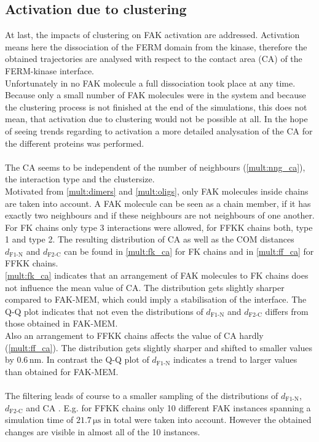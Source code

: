 \subsection{Activation due to clustering}
At last, the impacts of clustering on FAK activation are addressed. Activation means here the dissociation of the FERM domain from the kinase, therefore the obtained trajectories are analysed with respect to the contact area (CA) of the FERM-kinase interface.\\
Unfortunately in no FAK molecule a full dissociation took place at any time. Because only a small number of FAK molecules were in the system and because the clustering process is not finished at the end of the simulations, this does not mean, that activation due to clustering would not be possible at all. In the hope of seeing trends regarding to activation a more detailed analysation of the CA for the different proteins was performed.\\
\\
The CA seems to be independent of the number of neighbours (\autoref{mult:nng_ca}), the interaction type and the clustersize.\\
Motivated from \autoref{mult:dimers} and \autoref{mult:oligs}, only FAK molecules inside chains are taken into account. A FAK molecule can be seen as a chain member, if it has exactly two neighbours and if these neighbours are not neighbours of one another. For FK chains only type 3 interactions were allowed, for FFKK chains both, type 1 and type 2. The resulting distribution of CA as well as the COM distances $d_\text{F1-N}$ and $d_\text{F2-C}$ can be found in \autoref{mult:fk_ca} for FK chains and in \autoref{mult:ff_ca} for FFKK chains.\\
\autoref{mult:fk_ca} indicates that an arrangement of FAK molecules to FK chains does not influence the mean value of CA. The distribution gets slightly sharper compared to FAK-MEM, which could imply a stabilisation of the interface. The Q-Q plot indicates that not even the distributions of $d_\text{F1-N}$ and $d_\text{F2-C}$ differs from those obtained in FAK-MEM.\\
Also an arrangement to FFKK chains affects the value of CA hardly (\autoref{mult:ff_ca}). The distribution gets slightly sharper and shifted to smaller values by $0.6\,\si{\nano\metre}$. In contrast the Q-Q plot of $d_\text{F1-N}$ indicates a trend to larger values than obtained for FAK-MEM.\\
\\
The filtering leads of course to a smaller sampling of the distributions of $d_\text{F1-N}$, $d_\text{F2-C}$ and CA . E.g. for FFKK chains only 10 different FAK instances spanning a simulation time of $21.7\,\si{\micro\second}$ in total were taken into account. However the obtained changes are visible in almost all of the 10 instances.
